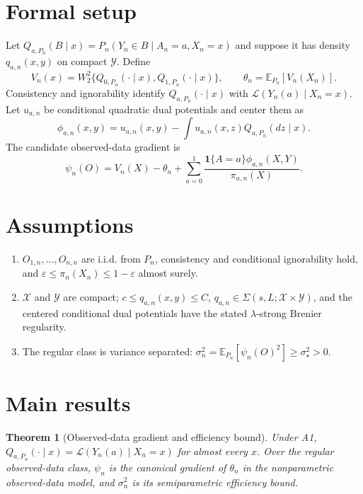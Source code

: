 \documentclass[11pt]{article}
\newcommand{\E}{\mathbb{E}}
\newcommand{\one}{\mathbf{1}}
\newtheorem{theorem}{Theorem}
\begin{document}
\section{Formal setup}
Let \(Q_{a,P_n}(B\mid x)=P_n(Y_n\in B\mid A_n=a,X_n=x)\) and suppose it has density \(q_{a,n}(x,y)\) on compact \(\mathcal Y\). Define
\[
 V_n(x)=W_2^2\{Q_{0,P_n}(\cdot\mid x),Q_{1,P_n}(\cdot\mid x)\},\qquad
 \theta_n=\E_{P_n}[V_n(X_n)].
\]
Consistency and ignorability identify \(Q_{a,P_n}(\cdot\mid x)\) with \(\mathcal L(Y_n(a)\mid X_n=x)\). Let \(u_{a,n}\) be conditional quadratic dual potentials and center them as
\[
 \phi_{a,n}(x,y)=u_{a,n}(x,y)-\int u_{a,n}(x,z)Q_{a,P_n}(dz\mid x).
\]
The candidate observed-data gradient is
\[
 \psi_n(O)=V_n(X)-\theta_n+\sum_{a=0}^1\frac{\one\{A=a\}\phi_{a,n}(X,Y)}{\pi_{a,n}(X)}.
\]

\section{Assumptions}
\begin{enumerate}[label=\textbf{A\arabic*.},leftmargin=*]
\item \(O_{1,n},\ldots,O_{n,n}\) are i.i.d. from \(P_n\), consistency and conditional ignorability hold, and \(\varepsilon\leq\pi_n(X_n)\leq1-\varepsilon\) almost surely.
\item \(\mathcal X\) and \(\mathcal Y\) are compact; \(c\leq q_{a,n}(x,y)\leq C\), \(q_{a,n}\in\Sigma(s,L;\mathcal X\times\mathcal Y)\), and the centered conditional dual potentials have the stated \(\lambda\)-strong Brenier regularity.
\item The regular class is variance separated: \(\sigma_n^2=\E_{P_n}[\psi_n(O)^2]\geq\sigma_\star^2>0\).
\end{enumerate}

\section{Main results}
\begin{theorem}[Observed-data gradient and efficiency bound]\label{thm:observed-gradient}
Under A1, \(Q_{a,P_n}(\cdot\mid x)=\mathcal L(Y_n(a)\mid X_n=x)\) for almost every \(x\). Over the regular observed-data class, \(\psi_n\) is the canonical gradient of \(\theta_n\) in the nonparametric observed-data model, and \(\sigma_n^2\) is its semiparametric efficiency bound.
\end{theorem}
\end{document}
